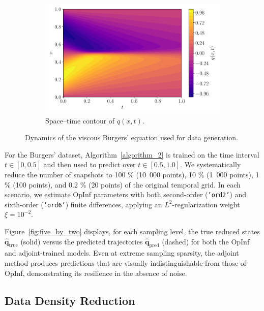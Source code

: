\begin{figure}[h!]
  \begin{subfigure}[t]{0.5\textwidth}
    \centering
    \includegraphics[width=\textwidth]{figures/heatmap_001.pdf}
    \caption{Space–time contour of \(q(x,t)\).}
    \label{fig:burgers-contour}
  \end{subfigure}
  \caption{Dynamics of the viscous Burgers’ equation used for data generation.}
  \label{fig:burgers-data}
\end{figure}


For the Burgers’ dataset, Algorithm~\ref{algorithm_2} is trained on the time interval $t\in[0,0.5]$ and then used to predict over $t\in[0.5,1.0]$. We systematically reduce the number of snapshots to 100 \% (10~000 points), 10 \% (1~000 points), 1 \% (100 points), and 0.2 \% (20 points) of the original temporal grid. In each scenario, we estimate OpInf parameters with both second-order (\texttt{'ord2'}) and sixth-order (\texttt{'ord6'}) finite differences, applying an $L^2$-regularization weight $\xi=10^{-2}$.  

Figure~\ref{fig:five_by_two} displays, for each sampling level, the true reduced states $\hat{\mathbf{q}}_{\mathrm{true}}$ (solid) versus the predicted trajectories $\hat{\mathbf{q}}_{\mathrm{pred}}$ (dashed) for both the OpInf and adjoint-trained models. Even at extreme sampling sparsity, the adjoint method produces predictions that are visually indistinguishable from those of OpInf, demonstrating its resilience in the absence of noise.

\newpage


\subsection*{Data Density Reduction}

